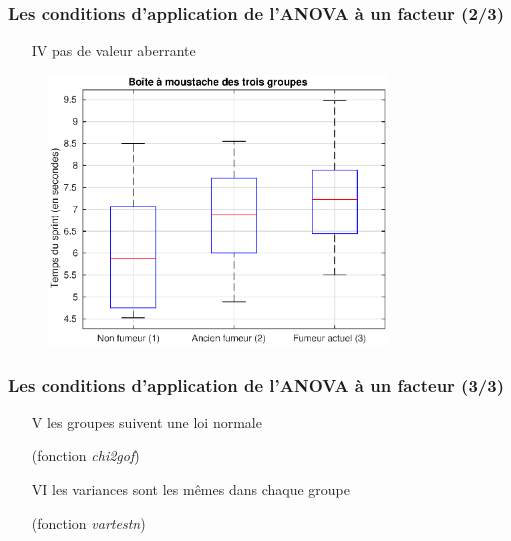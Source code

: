 \documentclass{beamer}
\begin{document}
\begin{frame}
\frametitle{Les conditions d'application de l'ANOVA à un facteur (2/3)}

\begin{itemize}
\item[IV] pas de valeur aberrante
\end{itemize} 

\begin{figure}[H]
\centerline{\includegraphics[width=9cm]{Images/BoiteAMoustachesParGroupe}}
\label{1}
\end{figure}
\end{frame}

\begin{frame}
\frametitle{Les conditions d'application de l'ANOVA à un facteur (3/3)}
\begin{itemize}
\item[V] les groupes suivent une loi normale  \\
\item[] (fonction \emph{chi2gof}) \\
\item[]
\item[VI] les variances sont les mêmes dans chaque groupe \\
\item[] (fonction \emph{vartestn})
\end{itemize} 
\end{frame}
\end{document}
